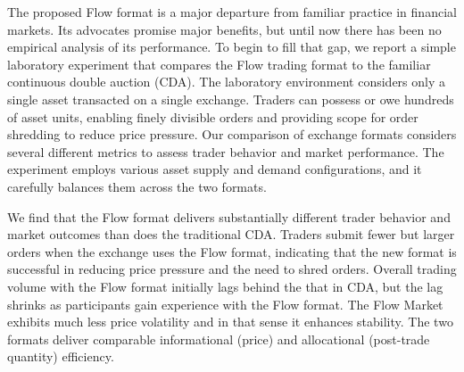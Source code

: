 The proposed Flow format is a major departure from familiar practice in financial markets. 
Its advocates promise major benefits, but until now there has been no empirical analysis of its  performance. 
To begin to fill that gap, we report  a simple laboratory experiment that compares the Flow trading format to the familiar continuous double auction (CDA). 
The laboratory environment considers only a single asset transacted on a single exchange. 
Traders can possess or owe hundreds of asset units, enabling finely divisible orders and providing scope for order shredding to reduce price pressure. 
Our comparison of exchange formats considers several different metrics to assess trader behavior and market performance.
The experiment employs various asset supply and demand configurations, and it carefully balances them across the two formats.




We find that the Flow format delivers substantially different trader behavior and market outcomes than does the traditional CDA.  
Traders submit fewer but larger orders when the exchange uses the Flow format, indicating that the new format is successful in reducing price pressure and the need to shred orders.
Overall trading volume with the Flow format initially lags behind the that in CDA, but the lag shrinks as participants gain experience with the Flow format. 
The Flow Market exhibits much less price volatility and in that sense it enhances stability. 
The two formats deliver comparable
informational (price) and allocational (post-trade quantity)  efficiency. 

